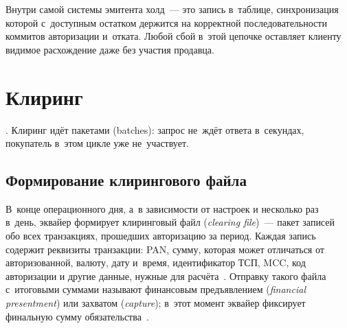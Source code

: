
Внутри самой системы эмитента холд~--- это запись в~таблице,
синхронизация которой с~доступным остатком держится на корректной
последовательности коммитов авторизации и~отката. Любой сбой в~этой
цепочке оставляет клиенту видимое расхождение даже без участия
продавца.


\section{Клиринг}\label{sec:tx-clearing}

.
Клиринг идёт пакетами (batches): запрос не~ждёт ответа в~секундах,
покупатель в~этом цикле уже не~участвует.

\subsection*{Формирование клирингового файла}

В~конце операционного дня, а~в зависимости от настроек и
несколько раз в~день, эквайер формирует клиринговый файл (\textit{clearing file})~---
пакет записей обо всех транзакциях, прошедших авторизацию за период.
Каждая запись содержит реквизиты транзакции: PAN, сумму, которая
может отличаться от авторизованной, валюту, дату и~время,
идентификатор ТСП, MCC, код авторизации и другие данные,
нужные для расчёта~\cite{mc-rules}. Отправку такого файла с~итоговыми
суммами называют финансовым предъявлением (\textit{financial presentment})
или захватом (\textit{capture}); в~этот момент эквайер фиксирует финальную
сумму обязательства~\cite{visa-tadg,mc-tpr}.

